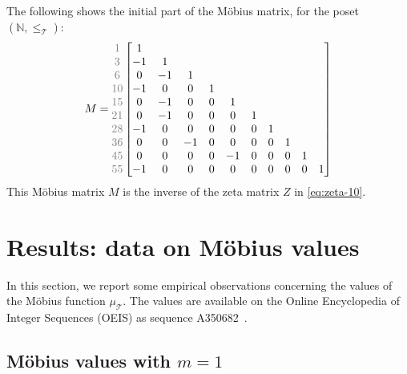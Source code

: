 \documentclass{amsart}
\theoremstyle{definition}
\newcommand{\NN}{\mathbb{N}}
\newcommand{\Mobius}{M\"obius}
\newcommand{\leqtri}{\leq_{\tri}}
\newcommand{\mutri}{\mu_{\tri}}
\newcommand{\tri}{\mathcal T}
\begin{document}
The following shows the initial part of the \Mobius{} matrix, for the poset $(\NN, \leqtri)$:
\begin{equation}
    M = {\color{gray}\begin{matrix}
        1 \\3 \\6 \\10 \\15 \\ 
        21 \\ 28 \\ 36 \\ 45 \\ 55
    \end{matrix}}
    \begin{bmatrix}
    1 \\
    -1 & 1 \\
    0 & -1 & 1 \\
    -1 & 0 & 0 & 1 \\
    0 & -1 & 0 & 0 & 1 \\
    0 & -1 & 0 & 0 & 0 & 1 \\
    -1 & 0 & 0 & 0 & 0 & 0 & 1 \\
    0 & 0 & -1 & 0 & 0 & 0 & 0 & 1 \\
    0 & 0 & 0 & 0 & -1 & 0 & 0 & 0 & 1 \\
    -1 & 0 & 0 & 0 & 0 & 0 & 0 & 0 & 0 & 1
    \end{bmatrix}
\end{equation}
This \Mobius{} matrix $M$ is the inverse of the zeta matrix $Z$ in \eqref{eq:zeta-10}. 





\section{Results: data on \Mobius{} values}

In this section, we report some empirical observations concerning the values of the \Mobius{} function $\mutri$.
The values are available on the Online Encyclopedia of Integer Sequences (OEIS) as sequence A350682~\cite{OEIS-mobius}.

\subsection{\Mobius{} values with \texorpdfstring{$m=1$}{m = 1}}
\end{document}
